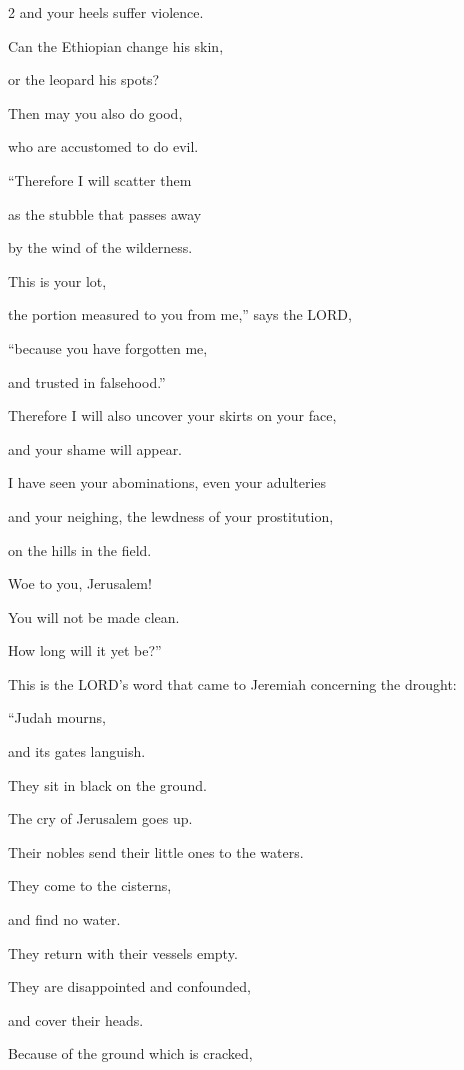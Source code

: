 \begin{multicols}{2}
	and your heels suffer violence.
	
	
	\myverse{}Can the Ethiopian change his skin,
	
	or the leopard his spots?
	
	Then may you also do good,
	
	who are accustomed to do evil.
	
	\vspace{\baselineskip}
	
	\myverse{}“Therefore I will scatter them
	
	as the stubble that passes away
	
	by the wind of the wilderness.
	
	
	\myverse{}This is your lot,
	
	the portion measured to you from me,” says the LORD,
	
	“because you have forgotten me,
	
	and trusted in falsehood.”
	
	
	\myverse{}Therefore I will also uncover your skirts on your face,
	
	and your shame will appear.
	
	
	\myverse{}I have seen your abominations, even your adulteries
	
	and your neighing, the lewdness of your prostitution,
	
	on the hills in the field.
	
	Woe to you, Jerusalem!
	
	You will not be made clean.
	
	How long will it yet be?”

\mychapter{}\myverse*{}This is the LORD’s word that came to Jeremiah concerning the drought:


\myverse{}“Judah mourns,

and its gates languish.

They sit in black on the ground.

The cry of Jerusalem goes up.


\myverse{}Their nobles send their little ones to the waters.

They come to the cisterns,

and find no water.

They return with their vessels empty.

They are disappointed and confounded,

and cover their heads.


\myverse{}Because of the ground which is cracked,


\end{multicols}
